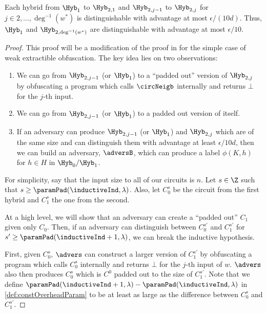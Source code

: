 \begin{lemma}
	\label{lemma:hybB}
	Each hybrid from $\Hyb_1$ to $\Hyb_{2, 1}$ and $\Hyb_{2, j - 1}$ to $\Hyb_{2, j}$ for $j \in 2, \dots, \deg^{-1}(w^*)$
	is distinguishable with advantage at most $\epsilon / (10d)$. Thus, $\Hyb_1$ and $\Hyb_{2, \deg^{-1}(w^*)}$ are distinguishable with advantage at most $\epsilon / 10$.
	\begin{proof}
		This proof will be a modification of the proof in \cite{ishai2015public} for the simple case of weak extractible obfuscation.
		The key idea lies on two observations:
		\begin{enumerate}[labelsep=0.1em]
			\item We can go from $\Hyb_{2, j - 1}$ (or $\Hyb_1$) to a ``padded out'' version of $\Hyb_{2, j}$ by obfuscating a program which calls $\circNeigb$ internally and returns $\bot$ for the $j$-th input.
			\item We can go from $\Hyb_{2, j - 1}$ (or $\Hyb_1$) to a padded out version of itself.
			\item If an adversary can produce $\Hyb_{2, j - 1}$ (or $\Hyb_1$) and $\Hyb_{2, j}$ which are of the same size and can distinguish them with advantage at least $\epsilon / 10d$,
			then we can build an adversary, $\adversB$, which can produce a label $\phi(K, h)$ for $h \in H$ in $\Hyb_0/ \Hyb_1$.
		\end{enumerate}

		For simplicity, say that the input size to all of our circuits is $n$. Let $s \in \Z$ such that $s \geq \paramPad(\inductiveInd, \lambda)$.
		Also, let $C_0^s$ be the circuit from the first hybrid and $C_1^s$ the one from the second.

		At a high level, we will show that an adversary can create a ``padded out'' $C_1$ given only $C_0$. Then, 
		if an adversary can distinguish between $C_0^{s'}$ and $C_1^{s'}$ for $s' \geq \paramPad(\inductiveInd + 1, \lambda)$, we can break the inductive hypothesis.

		First, given $C_0^s$, $\advers$ can construct a larger version of $C_1^{s'}$ by obfuscating a program which calls $C_0^s$ internally and returns $\bot$ for the $j$-th input of $w$.
		$\advers$ also then produces $C_0^s$ which is $C^0$ padded out to the size of $C_1^{s'}$.
		Note that we define $\paramPad(\inductiveInd + 1, \lambda) - \paramPad(\inductiveInd, \lambda)$ in \cref{def:constOverheadParam} to be
		at least as large as the difference between $C_0^s$ and $C_1^{s'}$.


\end{proof}
\end{lemma}
